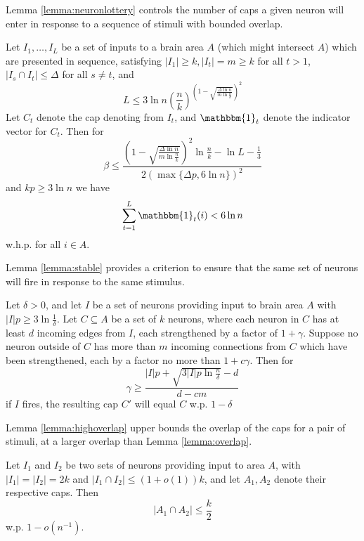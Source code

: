 \documentclass[12pt,nosubfloats]{alt2024} %
\newcommand{\1}{\mathbbm{1}}
\begin{document}
Lemma \ref{lemma:neuronlottery} controls the number of caps a given neuron will enter in response to a sequence of stimuli with bounded overlap.

\begin{lemma} \label{lemma:neuronlottery}
Let $I_1, \ldots, I_L$ be a set of inputs to a brain area $A$ (which might intersect $A$) which are presented in sequence, satisfying $|I_1| \ge k, |I_t| = m \ge k$ for all $t > 1$, $|I_s \cap I_t| \le \Delta$ for all $s \neq t$, and 
\[L \le 3 \ln n \left(\frac{n}{k}\right)^{(1 - \sqrt{\frac{\Delta \ln n}{m \ln \frac{n}{k}}})^2} \] Let $C_t$ denote the cap denoting from $I_t$, and $\1_t$ denote the indicator vector for $C_t$. 
Then for 
\[\beta \le \frac{ (1 - \sqrt{\frac{\Delta \ln n}{m \ln \frac{n}{k}}})^2 \ln \frac{n}{k} - \ln L - \frac{1}{3}}{2 (\max \{\Delta p, 6 \ln n\})^2 }\]
and $kp \ge 3 \ln n$ we have
\[\sum_{t=1}^L \1_t(i) < 6 \ln n \]
w.h.p. for all $i \in A$.
\end{lemma}

Lemma \ref{lemma:stable} provides a criterion to ensure that the same set of neurons will fire in response to the same stimulus.

\begin{lemma} \label{lemma:stable}
Let $\delta > 0$, and let $I$ be a set of neurons providing input to brain area $A$ with $|I|p \ge 3 \ln \frac{1}{\delta}$. Let $C \subseteq A$ be a set of $k$ neurons, where each neuron in $C$ has at least $d$ incoming edges from $I$, each strengthened by a factor of $1 + \gamma$. Suppose no neuron outside of $C$ has more than $m$ incoming connections from $C$ which have been strengthened, each by a factor no more than $1+c\gamma$. Then for 
\[\gamma \ge \frac{|I|p + \sqrt{3|I|p \ln \frac{n}{\delta}} - d}{d-cm}\]
if $I$ fires, the resulting cap $C'$ will equal $C$ w.p. $1 - \delta$
\end{lemma}

Lemma \ref{lemma:highoverlap} upper bounds the overlap of the caps for a pair of stimuli, at a larger overlap than Lemma \ref{lemma:overlap}.

\begin{lemma} \label{lemma:highoverlap}
Let $I_1$ and $I_2$ be two sets of neurons providing input to area $A$, with $|I_1| = |I_2| = 2k$ and $|I_1 \cap I_2| \le (1 + o(1))k$, and let $A_1, A_2$ denote their respective caps. Then
\[|A_1 \cap A_2| \le \frac{k}{2}\]
w.p. $1 - o(n^{-1})$.
\end{lemma}
\end{document}
